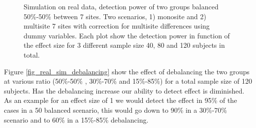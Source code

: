\documentclass[authoryear]{elsarticle}
\begin{document}
\begin{figure}[tbp]
\centering
\captionsetup[subfloat]{labelformat=empty}
\hspace{1mm}
\hspace{1mm}
\hspace{1mm}
\caption{
Simulation on real data, detection power of two groups balanced 50\%-50\% between 7 sites. Two scenarios, 1) monosite and 2) multisite 7 sites with correction for multisite differences using dummy variables. Each plot show the detection power in function of the effect size for 3 different sample size 40, 80 and 120 subjects in total.
}
\label{fig_real_sim_samplesize}
\end{figure}

Figure \ref{fig_real_sim_debalancing} show the effect of debalancing the two groups at various ratio (50\%-50\% , 30\%-70\% and 15\%-85\%) for a total sample size of 120 subjects. Has the debalancing increase our ability to detect effect is diminished. As an example for an effect size of 1 we would detect the effect in 95\% of the cases in a 50 balanced scenario, this would go down to 90\% in a 30\%-70\% scenario and to 60\% in a 15\%-85\% debalancing. 
\end{document}
